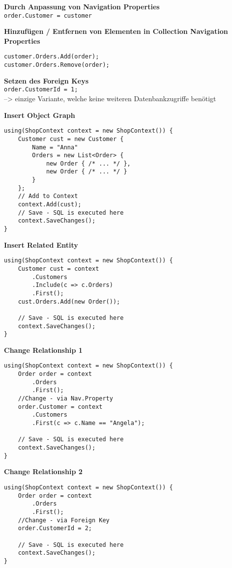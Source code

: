 \textbf{Durch Anpassung von Navigation Properties}\\
\lstinline{order.Customer = customer}

\textbf{Hinzufügen / Entfernen von Elementen in Collection Navigation Properties} \\
\begin{lstlisting}
customer.Orders.Add(order);
customer.Orders.Remove(order);
\end{lstlisting}

\textbf{Setzen des Foreign Keys} \\
\lstinline{order.CustomerId = 1;} \\
--> einzige Variante, welche keine weiteren Datenbankzugriffe benötigt

\textbf{Insert Object Graph} \\
\begin{lstlisting}
using(ShopContext context = new ShopContext()) {
    Customer cust = new Customer {
        Name = "Anna"
        Orders = new List<Order> {
            new Order { /* ... */ },
            new Order { /* ... */ }
        }
    };
    // Add to Context
    context.Add(cust);
    // Save - SQL is executed here
    context.SaveChanges();
}
\end{lstlisting}

\textbf{Insert Related Entity} \\
\begin{lstlisting}
using(ShopContext context = new ShopContext()) {
    Customer cust = context
        .Customers
        .Include(c => c.Orders)
        .First();
    cust.Orders.Add(new Order());
    
    // Save - SQL is executed here
    context.SaveChanges();
}
\end{lstlisting}

\textbf{Change Relationship 1} \\
\begin{lstlisting}
using(ShopContext context = new ShopContext()) {
    Order order = context
        .Orders
        .First();
    //Change - via Nav.Property
    order.Customer = context
        .Customers
        .First(c => c.Name == "Angela");
    
    // Save - SQL is executed here
    context.SaveChanges();
}
\end{lstlisting}

\textbf{Change Relationship 2} \\
\begin{lstlisting}
using(ShopContext context = new ShopContext()) {
    Order order = context
        .Orders
        .First();
    //Change - via Foreign Key
    order.CustomerId = 2;
    
    // Save - SQL is executed here
    context.SaveChanges();
}
\end{lstlisting}

